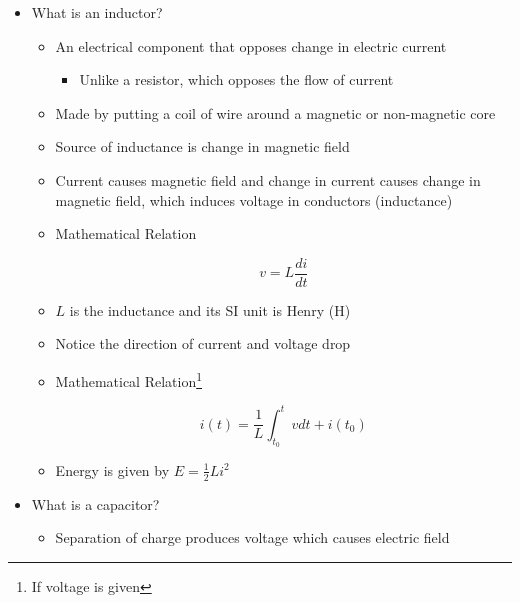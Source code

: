 \begin{itemize}

  \item What is an inductor?

    \begin{itemize}

      \item An electrical component that opposes change in electric current

        \begin{itemize}

          \item Unlike a resistor, which opposes the flow of current

        \end{itemize}

      \item Made by putting a coil of wire around a magnetic or non-magnetic core

      \item Source of inductance is change in magnetic field

      \item Current causes magnetic field and change in current causes change in magnetic field, which induces voltage in conductors (inductance)

      \item Mathematical Relation

        $$\boxed{v=L\frac{di}{dt}}$$

      \item $L$ is the inductance and its SI unit is Henry ($\si{\henry}$)

      \item Notice the direction of current and voltage drop

      \item Mathematical Relation\footnote{If voltage is given}

        $$\boxed{i(t)=\frac{1}{L}\int_{t_0}^t vdt+i(t_0)}$$

      \item Energy is given by $E=\frac{1}{2}Li^2$

    \end{itemize}

  \item What is a capacitor?

    \begin{itemize}

      \item Separation of charge produces voltage which causes electric field


\end{itemize}
\end{itemize}
